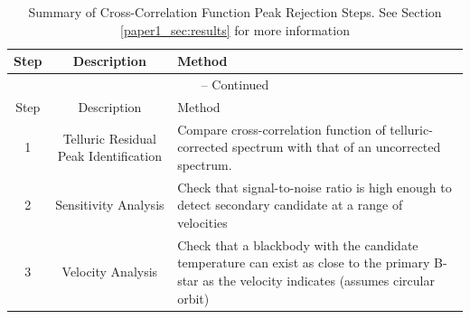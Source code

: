   
  
\clearpage
 \begin{small}
   \begin{longtable}{|ccp{6cm}|}
      \caption{Summary of Cross-Correlation Function Peak Rejection Steps. See Section \ref{paper1_sec:results} for more information \label{paper1_tab:rejection}} \\
        \hline
        Step  & Description & Method \\ \hline
        \endfirsthead

        \multicolumn{3}{c}{{\tablename} \thetable{} -- Continued} \\
        \hline
        Step  & Description & Method \\ \hline
        \endhead

        \hline
        \endfoot

        \hline
        \endlastfoot

        1 & Telluric Residual Peak Identification & Compare cross-correlation function of telluric-corrected spectrum with that of an uncorrected spectrum. \\

        \hline
        2 & Sensitivity Analysis & Check that signal-to-noise ratio
        is high enough to detect secondary candidate at a range of velocities \\

        \hline
        3 & Velocity Analysis & Check that a blackbody with the
        candidate temperature can exist as close to the primary B-star as the velocity indicates (assumes circular orbit)
        
        
    
  \end{longtable}
 \end{small}

